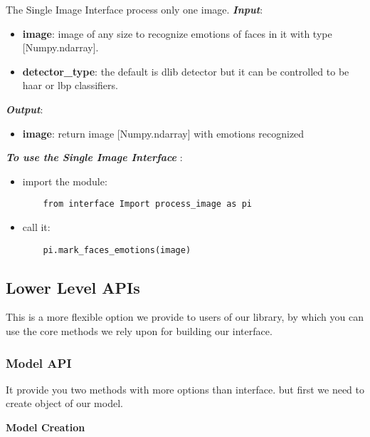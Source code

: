 The Single Image Interface process only one image.
\newline
\noindent\textbf{\textit{Input}}:
\begin{itemize}
	\item \textbf{image}:\newline
	image of any size to recognize emotions of faces in it with type [Numpy.ndarray].
	\item \textbf{detector\_type}: the default is dlib detector but it can be controlled to be haar or lbp classifiers.
\end{itemize}
\noindent\textbf{\textit{Output}}:
\begin{itemize}
	\item \textbf{image}:\newline
	return image [Numpy.ndarray] with emotions recognized 
\end{itemize}

\noindent \textbf{\textit{To use the Single Image Interface }}:
\begin{itemize}
	\item import the module:
	\begin{verbatim}
	from interface Import process_image as pi
	\end{verbatim}
	\item call it:
	\begin{verbatim}
	pi.mark_faces_emotions(image)
	\end{verbatim}
\end{itemize}


\begin{center}
	\subsection{Lower Level APIs}
	This is a more flexible option we provide to users of our library, by which you can use the core methods we rely upon for building our interface.
\end{center}


\subsubsection{Model API}
It provide you two methods with more options than interface.\newline
but first we need to create object of our model.
\bigbreak

\textbf{Model Creation}


